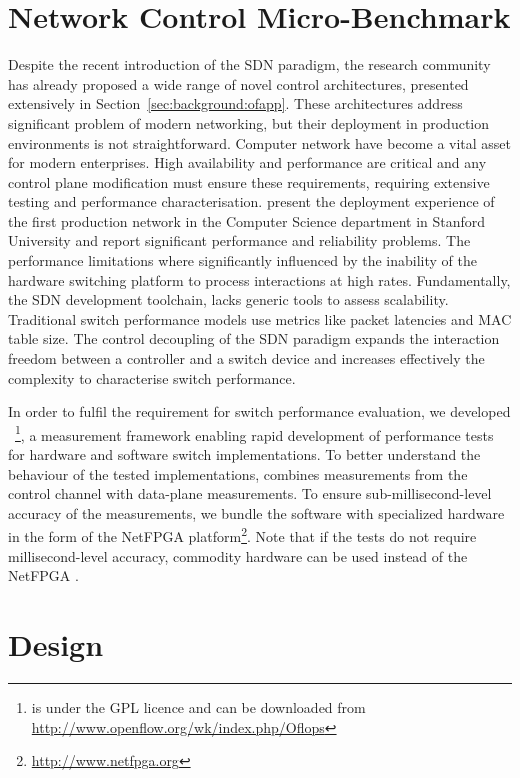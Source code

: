 \section{Network Control Micro-Benchmark} \label{sec:oflops-intro}

Despite the recent introduction of the SDN paradigm, the research community has
already proposed a wide range of novel control architectures, presented
extensively in Section~\ref{sec:background:ofapp}. These architectures address
significant problem of modern networking, but their deployment in production
environments is not straightforward.  Computer network have become a vital asset
for modern enterprises.  High availability and performance are critical and any
control plane modification must ensure these requirements, requiring extensive
testing and performance characterisation.   present the
deployment experience of the first \of production network in the Computer
Science department in Stanford University and report significant performance and
reliability problems.  The performance limitations where significantly
influenced by the inability of the hardware switching platform to process \of
interactions at high rates.  Fundamentally, the SDN development toolchain, lacks
generic tools to assess \of scalability.  Traditional switch performance models
use metrics like packet latencies and MAC table size. The control decoupling of
the SDN paradigm expands the interaction freedom between a controller and a
switch device and increases effectively the complexity to characterise switch
performance. 

In order to fulfil the requirement for \of switch performance evaluation, we
developed \oflops~\footnote{\oflops is under the GPL licence and can be
  downloaded from \url{http://www.openflow.org/wk/index.php/Oflops}}, a
measurement framework enabling rapid development of performance tests for
hardware and software \of switch implementations. To better understand the
behaviour of the tested \of implementations, \oflops combines measurements from
the \of control channel with data-plane measurements. To ensure
sub-millisecond-level accuracy of the measurements, we bundle the \oflops
software with specialized hardware in the form of the NetFPGA
platform\footnote{\url{http://www.netfpga.org}}.  Note that if the tests do not
require millisecond-level accuracy, commodity hardware can be used instead of
the NetFPGA .

\section{\oflops Design}\label{sec:oflops-design}

